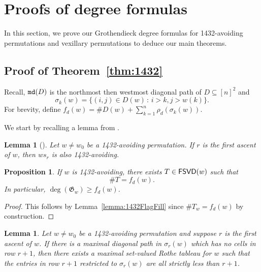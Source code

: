 \documentclass[12pt]{amsart}
\newtheorem{lemma}[theorem]{Lemma}
\newtheorem{proposition}[theorem]{Proposition}
\theoremstyle{definition}
\theoremstyle{remark}
\numberwithin{equation}{section}
\newcommand \mdCR[1]{{\tt md}(#1)}
\newcommand{\FSVD}{{\sf FSVD}}
\newcommand{\maxsizediag}{\rho_d}
\newcommand{\diagstat}{f_d}
\begin{document}
 \section{Proofs of degree formulas}
\label{sec:proofs}


In this section, we prove our Grothendieck degree formulas for 1432-avoiding permutations and vexillary permutations to deduce our main theorems. 



\subsection{Proof of Theorem~\ref{thm:1432}}



Recall, $\mdCR{D}$ is the northmost then westmost diagonal path of $D\subseteq [n]^2$
and
 \[\sigma_k(w)=\{ (i,j)\in D(w) \,:  \, i>k, j>w(k)\}.\]
For brevity, define $\diagstat(w)=\#D(w) + \sum_{k=1}^n \maxsizediag(\sigma_k(w))$.






We start by recalling a lemma from \cite{Fan.Guo}.
\begin{lemma}[{\cite[Lemma~2.4]{Fan.Guo}}]
Let $w\neq w_0$ be a 1432-avoiding permutation.  If $r$ is the first ascent of $w$, then $ws_r$ is also 1432-avoiding.
\end{lemma}






\begin{proposition}
	\label{prop:maxtabsize}
	If $w$ is 1432-avoiding, there exists $T\in \FSVD(w)$ such that \[\#T=\diagstat(w).\]  In particular, $\deg(\mathfrak G_w)\geq \diagstat(w)$.
\end{proposition}
\begin{proof}
    This follows by Lemma~\ref{lemma:1432FlagFill} since $\#T_w=\diagstat(w)$ by construction.
\end{proof}

\begin{lemma}
	\label{lemma:maxtabflag}
	Let $w\neq w_0$ be a 1432-avoiding permutation and suppose $r$ is the first ascent of $w$.  If there is a maximal diagonal path in $\sigma_r(w)$ which has no cells in row $r+1$, then there exists a maximal set-valued Rothe tableau for $w$ such that the entries in row $r+1$ restricted to $\sigma_r(w)$ are all strictly less than $r+1$.
\end{lemma}
\end{document}

